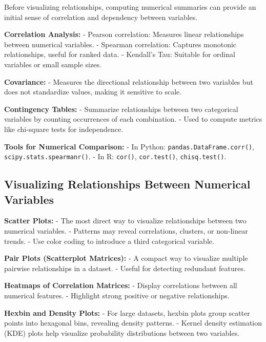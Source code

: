 \documentclass[12pt,openany]{book}
\begin{document}
Before visualizing relationships, computing numerical summaries can provide an initial sense of correlation and dependency between variables.
\newline

\textbf{Correlation Analysis:}
- Pearson correlation: Measures linear relationships between numerical variables.
- Spearman correlation: Captures monotonic relationships, useful for ranked data.
- Kendall’s Tau: Suitable for ordinal variables or small sample sizes.
\newline

\textbf{Covariance:}
- Measures the directional relationship between two variables but does not standardize values, making it sensitive to scale.
\newline

\textbf{Contingency Tables:}
- Summarize relationships between two categorical variables by counting occurrences of each combination.
- Used to compute metrics like chi-square tests for independence.
\newline

\textbf{Tools for Numerical Comparison:}
- In Python: \texttt{pandas.DataFrame.corr()}, \texttt{scipy.stats.spearmanr()}.
- In R: \texttt{cor()}, \texttt{cor.test()}, \texttt{chisq.test()}.

\subsection{Visualizing Relationships Between Numerical Variables}

\textbf{Scatter Plots:}
- The most direct way to visualize relationships between two numerical variables.
- Patterns may reveal correlations, clusters, or non-linear trends.
- Use color coding to introduce a third categorical variable.
\newline

\textbf{Pair Plots (Scatterplot Matrices):}
- A compact way to visualize multiple pairwise relationships in a dataset.
- Useful for detecting redundant features.
\newline

\textbf{Heatmaps of Correlation Matrices:}
- Display correlations between all numerical features.
- Highlight strong positive or negative relationships.
\newline

\textbf{Hexbin and Density Plots:}
- For large datasets, hexbin plots group scatter points into hexagonal bins, revealing density patterns.
- Kernel density estimation (KDE) plots help visualize probability distributions between two variables.
\newline
\end{document}
